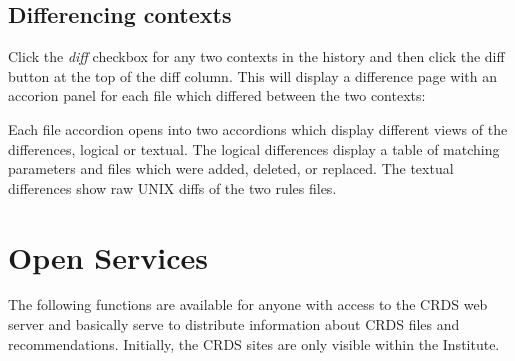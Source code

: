\documentclass[letterpaper,10pt,english]{sphinxmanual}
\begin{document}
\subsection{Differencing contexts}
\label{web_site_use:differencing-contexts}
Click the \emph{diff} checkbox for any two contexts in the history and then click the diff button
at the top of the diff column.   This will display a difference page with an accorion panel
for each file which differed between the two contexts:
\begin{figure}[htbp]
\centering

\end{figure}

Each file accordion opens into two accordions which display different views of the differences,
logical or textual.  The logical differences display a table of matching parameters and files
which were added, deleted, or replaced.   The textual differences show raw UNIX diffs of the
two rules files.


\section{Open Services}
\label{web_site_use:open-services}
The following functions are available for anyone with access to the CRDS web
server and basically serve to distribute information about CRDS files and
recommendations.   Initially,  the CRDS sites are only visible within the Institute.
\end{document}
